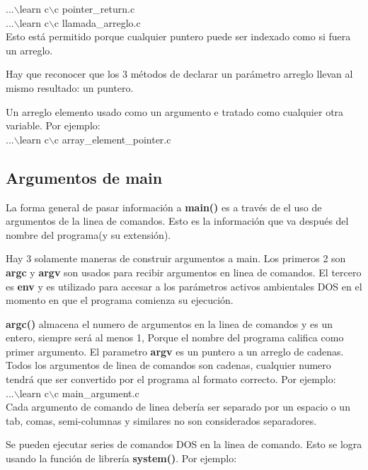\documentclass[]{article}
\begin{document}
	...$\backslash$learn c$\backslash$c pointer\_return.c\\
	
	...$\backslash$learn c$\backslash$c llamada\_arreglo.c\\
	
	Esto está permitido porque cualquier puntero puede ser indexado como si fuera un arreglo.
	
	Hay que reconocer que los 3 métodos de declarar un parámetro arreglo llevan al mismo resultado: un puntero.
	
	Un arreglo elemento usado como un argumento e tratado como cualquier otra variable. Por ejemplo:\\
	
	...$\backslash$learn c$\backslash$c array\_element\_pointer.c\\
	
	\subsection{Argumentos de main}
	
	La forma general de pasar información a \textbf{main()} es a través de el uso de argumentos de la linea de comandos. Esto es la información que va después del nombre del programa(y su extensión).
	
	Hay 3 solamente maneras de construir argumentos a main. Los primeros 2 son \textbf{argc} y \textbf{argv} son usados para recibir argumentos en linea de comandos. El tercero es \textbf{env} y es utilizado para accesar a los parámetros activos ambientales DOS en el momento en que el programa comienza su ejecución.
	
	\textbf{argc()} almacena el numero de argumentos en la linea de comandos y es un entero, siempre será al menos 1, Porque el nombre del programa califica como primer argumento. El parametro \textbf{argv} es un puntero a un arreglo de cadenas. Todos los argumentos de linea de comandos son cadenas, cualquier numero tendrá que ser convertido por el programa al formato correcto. Por ejemplo:\\
	 
	...$\backslash$learn c$\backslash$c main\_argument.c\\
	
	Cada argumento de comando de linea debería ser separado por un espacio o un tab, comas, semi-columnas y similares no son considerados separadores.
	
	Se pueden ejecutar series de comandos DOS en la linea de comando. Esto se logra usando la función de librería \textbf{system()}. Por ejemplo:\\
	
\end{document}
